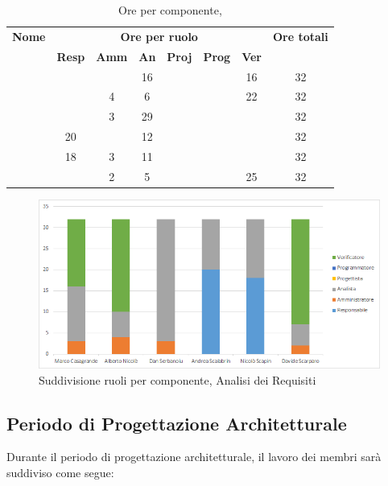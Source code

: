 \begin{table}[H]
	\begin{center}
		\begin{tabular}{|c|c|c|c|c|c|c|c|}
			\hline
			\textbf{Nome} & \multicolumn{6}{c|}{\textbf{Ore per ruolo}} & \textbf{Ore totali} \\\cline{2-7}
			& \textbf{Resp} & \textbf{Amm} & \textbf{An} & \textbf{Proj} & \textbf{Prog} & \textbf{Ver} & \\
			\hline
			\MC			&		&		&	16	&		&		&	16	&	32	\\
			\hline
			\AN			&		&	4	&	6	&	 	&		&	22	& 	32	\\
			\hline
			\DAN		&		&	3	&	29	&		&		&		&	32	\\
			\hline
			\AS			&	20	&	 	&	12 	&		&	 	& 		&	32	\\
			\hline
			\NS 		&	18	&	3	&	11	&		&		& 		&	32	\\
			\hline
			\DS			& 		&	2	&	5	&		&		&	25	&	32	\\
			\hline
		\end{tabular}
	\end{center}
	\caption{Ore per componente, \AdR}
\end{table}

\begin{figure}[H]
	\centering
	\includegraphics[scale=0.6]{img/6-1.png}
	\caption{Suddivisione ruoli per componente, Analisi dei Requisiti}
\end{figure}

\subsection{Periodo di Progettazione Architetturale}
Durante il periodo di progettazione architetturale, il lavoro dei membri sarà suddiviso come segue:

